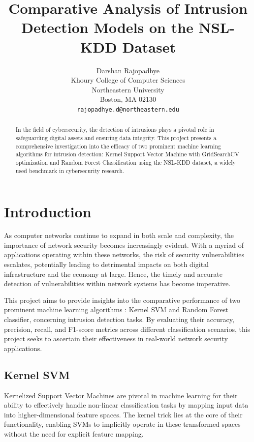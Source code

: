\documentclass{article}
\title{Comparative Analysis of Intrusion Detection Models on the NSL-KDD Dataset}
\author{
  Darshan Rajopadhye \\
  Khoury College of Computer Sciences\\
  Northeastern University\\
  Boston, MA 02130 \\
  \texttt{rajopadhye.d@northeastern.edu} \\
}
\begin{document}
\maketitle


\begin{abstract}
  In the field of cybersecurity, the detection of intrusions plays a pivotal role in safeguarding digital assets and ensuring data integrity. This project presents a comprehensive investigation into the efficacy of two prominent machine learning algorithms for intrusion detection: Kernel Support Vector Machine with GridSearchCV optimization and Random Forest Classification using the NSL-KDD dataset, a widely used benchmark in cybersecurity research.
\end{abstract}


\section{Introduction}


As computer networks continue to expand in both scale and complexity, the importance of network security becomes increasingly evident. With a myriad of applications operating within these networks, the risk of security vulnerabilities escalates, potentially leading to detrimental impacts on both digital infrastructure and the economy at large. Hence, the timely and accurate detection of vulnerabilities within network systems has become imperative.

This project aims to provide insights into the comparative performance of two prominent machine learning algorithms : Kernel SVM and Random Forest classifier, concerning intrusion detection tasks. By evaluating their accuracy, precision, recall, and F1-score metrics across different classification scenarios, this project seeks to ascertain their effectiveness in real-world network security applications.

\subsection{Kernel SVM}



Kernelized Support Vector Machines are pivotal in machine learning for their ability to effectively handle non-linear classification tasks by mapping input data into higher-dimensional feature spaces. The kernel trick lies at the core of their functionality, enabling SVMs to implicitly operate in these transformed spaces without the need for explicit feature mapping. 
\end{document}
